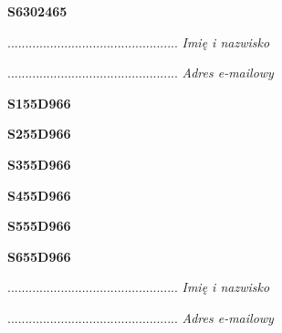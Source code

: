 \begin{turn}{90}\huge \textbf{S6302465}\end{turn}

\begin{turn}{90}\begin{minipage}{\linewidth} \vspace{20mm} ................................................  \textit{Imię i nazwisko}\end{minipage}\end{turn}

\begin{turn}{90}\begin{minipage}{\linewidth} \vspace{20mm} ................................................  \textit{Adres e-mailowy}\end{minipage}\end{turn}

\begin{turn}{90}\huge \textbf{S155D966}\end{turn}

\begin{turn}{90}\huge \textbf{S255D966}\end{turn}

\begin{turn}{90}\huge \textbf{S355D966}\end{turn}

\begin{turn}{90}\huge \textbf{S455D966}\end{turn}

\begin{turn}{90}\huge \textbf{S555D966}\end{turn}

\begin{turn}{90}\huge \textbf{S655D966}\end{turn}

\begin{turn}{90}\begin{minipage}{\linewidth} \vspace{20mm} ................................................  \textit{Imię i nazwisko}\end{minipage}\end{turn}

\begin{turn}{90}\begin{minipage}{\linewidth} \vspace{20mm} ................................................  \textit{Adres e-mailowy}\end{minipage}\end{turn}

